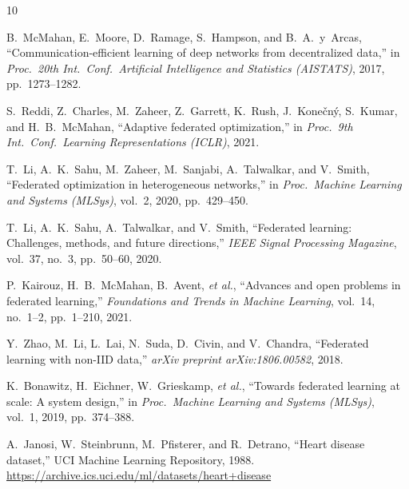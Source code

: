 \documentclass[12pt,a4paper]{report}
\begin{document}
\begin{thebibliography}{10}

B.~McMahan, E.~Moore, D.~Ramage, S.~Hampson, and B.~A.~y~Arcas,
``Communication-efficient learning of deep networks from decentralized data,''
in \textit{Proc.\ 20th Int.\ Conf.\ Artificial Intelligence and Statistics (AISTATS)}, 2017, pp.~1273--1282.

S.~Reddi, Z.~Charles, M.~Zaheer, Z.~Garrett, K.~Rush, J.~Kone\v{c}n\'{y}, S.~Kumar, and H.~B.~McMahan,
``Adaptive federated optimization,''
in \textit{Proc.\ 9th Int.\ Conf.\ Learning Representations (ICLR)}, 2021.

T.~Li, A.~K.~Sahu, M.~Zaheer, M.~Sanjabi, A.~Talwalkar, and V.~Smith,
``Federated optimization in heterogeneous networks,''
in \textit{Proc.\ Machine Learning and Systems (MLSys)}, vol.~2, 2020, pp.~429--450.

T.~Li, A.~K.~Sahu, A.~Talwalkar, and V.~Smith,
``Federated learning: Challenges, methods, and future directions,''
\textit{IEEE Signal Processing Magazine}, vol.~37, no.~3, pp.~50--60, 2020.

P.~Kairouz, H.~B.~McMahan, B.~Avent, \textit{et al.},
``Advances and open problems in federated learning,''
\textit{Foundations and Trends in Machine Learning}, vol.~14, no.~1--2, pp.~1--210, 2021.

Y.~Zhao, M.~Li, L.~Lai, N.~Suda, D.~Civin, and V.~Chandra,
``Federated learning with non-IID data,''
\textit{arXiv preprint arXiv:1806.00582}, 2018.

K.~Bonawitz, H.~Eichner, W.~Grieskamp, \textit{et al.},
``Towards federated learning at scale: A system design,''
in \textit{Proc.\ Machine Learning and Systems (MLSys)}, vol.~1, 2019, pp.~374--388.

A.~Janosi, W.~Steinbrunn, M.~Pfisterer, and R.~Detrano,
``Heart disease dataset,''
UCI Machine Learning Repository, 1988.
\url{https://archive.ics.uci.edu/ml/datasets/heart+disease}

\end{thebibliography}

\appendix
\end{document}
